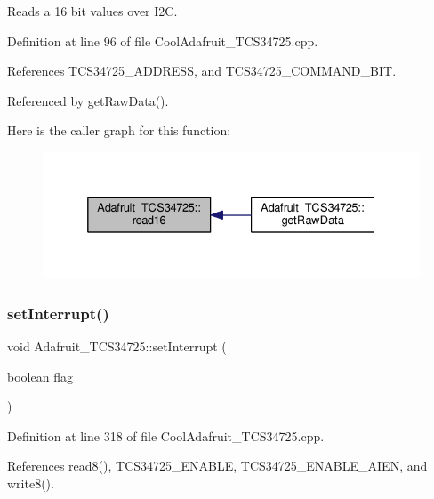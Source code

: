 Reads a 16 bit values over I2C. 



Definition at line 96 of file Cool\+Adafruit\+\_\+\+T\+C\+S34725.\+cpp.



References T\+C\+S34725\+\_\+\+A\+D\+D\+R\+E\+SS, and T\+C\+S34725\+\_\+\+C\+O\+M\+M\+A\+N\+D\+\_\+\+B\+IT.



Referenced by get\+Raw\+Data().

Here is the caller graph for this function\+:\nopagebreak
\begin{figure}[H]
\begin{center}
\leavevmode
\includegraphics[width=332pt]{df/d54/class_adafruit___t_c_s34725_a6b9b65ff0f1e57797a1c05a43fd25385_icgraph}
\end{center}
\end{figure}
\mbox{\label{class_adafruit___t_c_s34725_ae477b116ac93cf075be20637207aee57}} 
\subsubsection{\texorpdfstring{set\+Interrupt()}{setInterrupt()}}
{\footnotesize\ttfamily void Adafruit\+\_\+\+T\+C\+S34725\+::set\+Interrupt (\begin{DoxyParamCaption}\item[{boolean}]{flag }\end{DoxyParamCaption})}



Definition at line 318 of file Cool\+Adafruit\+\_\+\+T\+C\+S34725.\+cpp.



References read8(), T\+C\+S34725\+\_\+\+E\+N\+A\+B\+LE, T\+C\+S34725\+\_\+\+E\+N\+A\+B\+L\+E\+\_\+\+A\+I\+EN, and write8().

